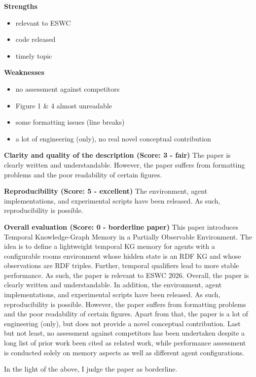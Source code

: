 \documentclass[runningheads]{llncs}
\begin{document}
\textbf{Strengths}
\begin{itemize}
  \item relevant to ESWC
  \item code released
  \item timely topic
\end{itemize}

\textbf{Weaknesses}
\begin{itemize}
  \item no assessment against competitors
  \item Figure 1 \& 4 almost unreadable
  \item some formatting issues (line breaks)
  \item a lot of engineering (only), no real novel conceptual contribution
\end{itemize}

\textbf{Clarity and quality of the description (Score: 3 - fair)} \quad The paper is clearly written and understandable. However, the paper suffers from formatting problems and the poor readability of certain figures.

\textbf{Reproducibility (Score: 5 - excellent)} \quad The environment, agent implementations, and experimental scripts have been released. As such, reproducibility is possible.

\textbf{Overall evaluation (Score: 0 - borderline paper)} \quad This paper introduces Temporal Knowledge-Graph Memory in a Partially Observable Environment. The idea is to define a lightweight temporal KG memory for agents with a configurable rooms environment whose hidden state is an RDF KG and whose observations are RDF triples. Further, temporal qualifiers lead to more stable performance. As such, the paper is relevant to ESWC 2026. Overall, the paper is clearly written and understandable. In addition, the environment, agent implementations, and experimental scripts have been released. As such, reproducibility is possible. However, the paper suffers from formatting problems and the poor readability of certain figures. Apart from that, the paper is a lot of engineering (only), but does not provide a novel conceptual contribution. Last but not least, no assessment against competitors has been undertaken despite a long list of prior work been cited as related work, while performance assessment is conducted solely on memory aspects as well as different agent configurations.

In the light of the above, I judge the paper as borderline.\\
\end{document}
